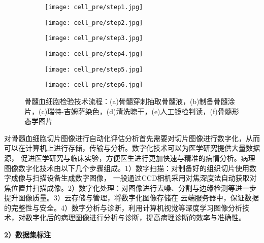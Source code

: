 \begin{figure}[htbp]
	\centering
	\begin{subfigure}{0.325\linewidth}
		\centering
		\texttt{[image: cell\_pre/step1.jpg]}
    \caption{}
	\end{subfigure}
	\centering
	\begin{subfigure}{0.325\linewidth}
		\centering
		\texttt{[image: cell\_pre/step2.jpg]}
    \caption{}
	\end{subfigure}
	\centering
	\begin{subfigure}{0.325\linewidth}
		\centering
		\texttt{[image: cell\_pre/step3.jpg]}
    \caption{}
	\end{subfigure}

	\centering
	\begin{subfigure}{0.325\linewidth}
		\centering
		\texttt{[image: cell\_pre/step4.jpg]}
    \caption{}
	\end{subfigure}
	\centering
	\begin{subfigure}{0.325\linewidth}
		\centering
		\texttt{[image: cell\_pre/step5.jpg]}
    \caption{}
	\end{subfigure}
	\centering
	\begin{subfigure}{0.325\linewidth}
		\centering
		\texttt{[image: cell\_pre/step6.jpg]}
    \caption{}
	\end{subfigure}
	\caption{骨髓血细胞检验技术流程：(a)骨髓穿刺抽取骨髓液，(b)制备骨髓涂片，(c)瑞特-吉姆萨染色，(d)清洗晾干，(e)人工镜检判读，(f)骨髓形态学图片}
	\label{fig:cell_pre}
\end{figure}

对骨髓血细胞切片图像进行自动化评估分析首先需要对切片图像进行数字化，从而可以在计算机上进行存储，传输与分析。数字化技术可以为医学研究提供大量数据源，
促进医学研究与临床实验，方便医生进行更加快速与精准的病情分析。病理图像数字化技术由以下几个步骤组成。1）数字扫描：对制备好的组织切片使用数字成像与扫描设备生成数字图像，
一般通过CCD相机采用对焦深度法自动获取对焦位置并扫描成像。2）数字化处理：对图像进行去噪、分割与边缘检测等进一步提升图像质量。3）云存储与管理，将数字化图像存储在
云端服务器中，保证数据的完整性与安全。4）数字分析与诊断，利用计算机视觉等深度学习图像分析技术，对数字化后的病理图像进行分析与诊断，提高病理诊断的效率与准确性。

\textbf{2）数据集标注}

